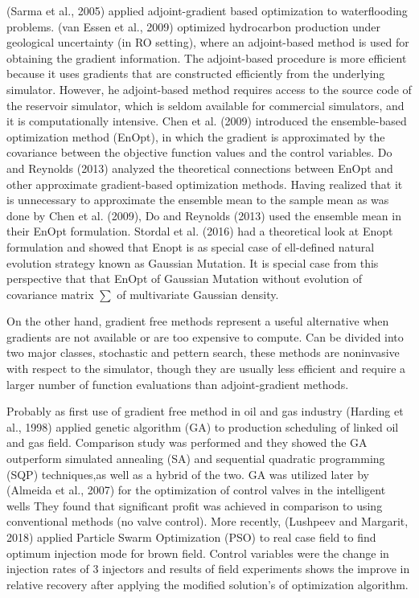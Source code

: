 \documentclass[]{elsarticle} %
\begin{document}
(Sarma et al., 2005) applied adjoint-gradient based optimization to waterflooding problems. (van Essen et al., 2009) optimized hydrocarbon production under geological uncertainty (in RO setting), where an adjoint-based method is used for obtaining the gradient information. The adjoint-based procedure is more efficient because it uses gradients that are constructed efficiently from the underlying simulator. However, he adjoint-based method requires access to the source code of the reservoir simulator, which is seldom available for commercial simulators, and it is computationally intensive. Chen et al. (2009) introduced the ensemble-based optimization method (EnOpt), in which the gradient is approximated by the covariance between the objective function values and the control variables. Do and Reynolds (2013) analyzed the theoretical connections between EnOpt and other approximate gradient-based optimization methods. Having realized that it is unnecessary to approximate the ensemble mean to the sample mean as was done by Chen et al. (2009), Do and Reynolds (2013) used the ensemble mean in their EnOpt formulation. Stordal et al. (2016) had a theoretical look at Enopt formulation and showed that Enopt is as special case of ell-defined natural evolution strategy known as Gaussian Mutation. It is special case from this perspective that that EnOpt of Gaussian Mutation without evolution of covariance matrix \(\sum\) of multivariate Gaussian density.

On the other hand, gradient free methods represent a useful alternative when gradients are not available or are too expensive to compute. Can be divided into two major classes, stochastic and pettern search, these methods are noninvasive with respect to the simulator, though they are usually less efficient and require a larger number of function evaluations than adjoint-gradient methods.

Probably as first use of gradient free method in oil and gas industry (Harding et al., 1998) applied genetic algorithm (GA) to production scheduling of linked oil and gas field. Comparison study was performed and they showed the GA outperform simulated annealing (SA) and sequential quadratic programming (SQP) techniques,as well as a hybrid of the two. GA was utilized later by (Almeida et al., 2007) for the optimization of control valves in the intelligent wells They found that significant profit was achieved in comparison to using conventional methods (no valve control). More recently, (Lushpeev and Margarit, 2018) applied Particle Swarm Optimization (PSO) to real case field to find optimum injection mode for brown field. Control variables were the change in injection rates of 3 injectors and results of field experiments shows the improve in relative recovery after applying the modified solution's of optimization algorithm.
\end{document}
